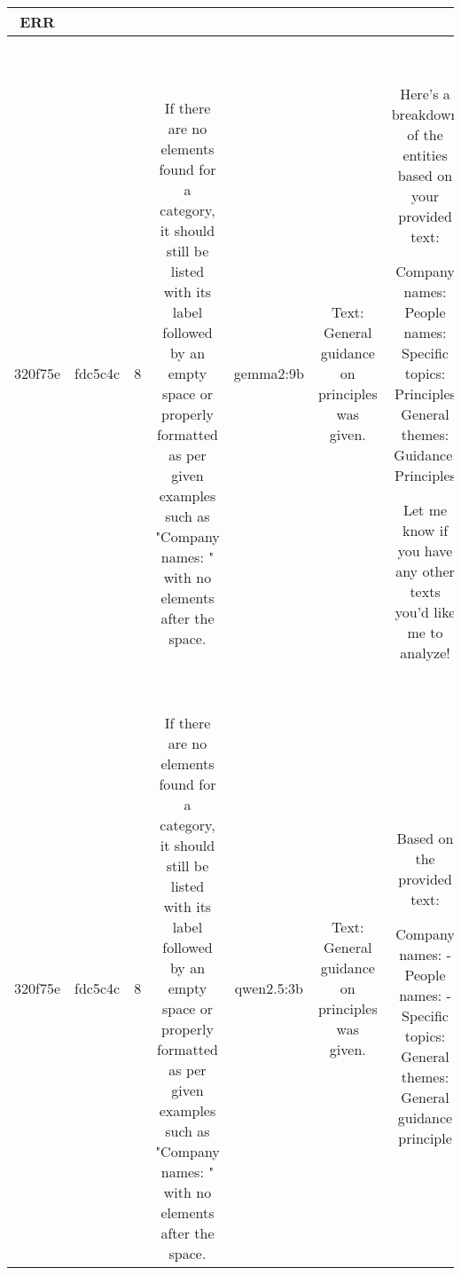 \begin{table}[h!]
\begin{tabular}{|c|c|c|c|c|c|c|c|c|c|}
ERR & \\
\hline
320f75e & fdc5c4c & 8 & If there are no elements found for a category, it should still be listed with its label followed by an empty space or properly formatted as per given examples such as "Company names: " with no elements after the space. & gemma2:9b & Text: General guidance on principles was given. & Here's a breakdown of the entities based on your provided text:

Company names:  
People names: 
Specific topics: Principles 
General themes: Guidance, Principles




Let me know if you have any other texts you'd like me to analyze! 
 & err & The output provided by the chatbot doesn't adhere fully to the required format as specified in the description. The desired format outlined asks for "<comma_separated_list_of_company_names>", "<comma_separated_list_of_people_names>", "<comma_separated_list_of_specific_topics>", and "<comma_separated_list_of_general_themes>". In the chatbot's output, for "Company names" and "People names", it is blank and should at least show empty placeholders if no entities are found. For "Specific topics", the output is given as a plain text list rather than indicating it as a comma-separated list as per the description. Similarly, for "General themes", although there is a comma separating the themes, it's not clear if it follows broad comma-separation convention since it's not in a list format.

The description also specifies presenting each category as a defined list format, which isn't precisely followed in the given response as it omits the expected format for some parts, even if empty. Also, the chatbot added an additional sentence, "Let me know if you have any other texts you'd like me to analyze!", which is not mentioned in the desired output format. This indicates a deviation as it's outside what's specified in the completion description. 

ERR & \\
\hline
320f75e & fdc5c4c & 8 & If there are no elements found for a category, it should still be listed with its label followed by an empty space or properly formatted as per given examples such as "Company names: " with no elements after the space. & qwen2.5:3b & Text: General guidance on principles was given. & Based on the provided text:

Company names: 
- People names:
- Specific topics: 
General themes: General guidance principle & err & The chatbot output does not comply with the desired format specified in the description. The expected format requires a list of company names, people names, specific topics, and general themes to be clearly separated and listed after respective labels (with comma-separated list for each category). In the output provided:


\end{tabular}
\end{table}
